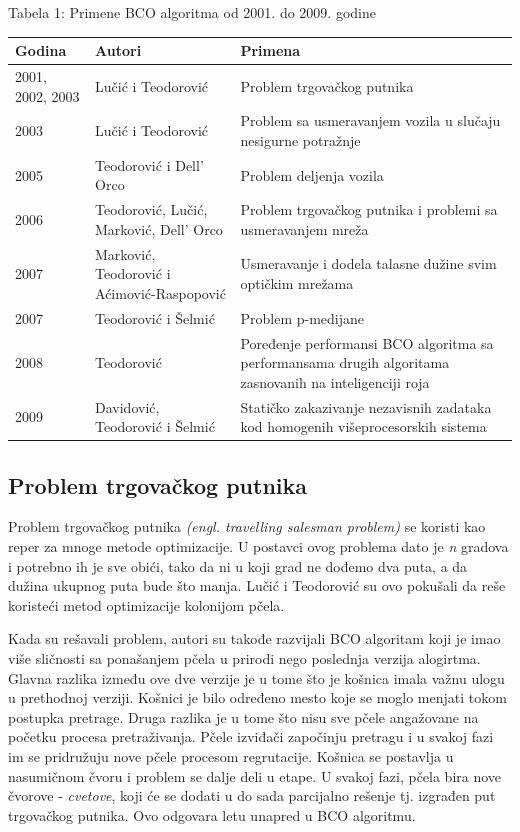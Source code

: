 \documentclass[a4paper]{article}
\begin{document}
{\begin{center}
Tabela 1: Primene BCO algoritma od 2001. do 2009. godine
\begin{tabular}{|p{1cm}|p{3cm}|p{5cm}|}
 \hline
Godina & Autori & Primena \\ \hline
2001, 2002, 2003&Lučić i Teodorović&Problem trgovačkog putnika\\ \hline
2003&Lučić i Teodorović&Problem sa usmeravanjem vozila u slučaju nesigurne potražnje\\ \hline
2005&Teodorović i Dell’ Orco&Problem deljenja vozila\\ \hline
2006&Teodorović, Lučić, Marković, Dell’ Orco & Problem trgovačkog putnika i problemi sa usmeravanjem mreža\\ \hline
2007&Marković, Teodorović i Aćimović-Raspopović & Usmeravanje i dodela talasne dužine svim optičkim mrežama\\ \hline
2007& Teodorović i Šelmić & Problem p-medijane\\ \hline
2008& Teodorović & Poređenje performansi BCO algoritma sa performansama drugih algoritama zasnovanih na inteligenciji roja\\ \hline
2009& Davidović, Teodorović i Šelmić & Statičko zakazivanje nezavisnih zadataka kod homogenih višeprocesorskih sistema\\ \hline
\end{tabular}\par
\bigskip
\end{center}

\subsection{Problem trgovačkog putnika}
\label{subsec:prvaprimena}
Problem trgovačkog putnika {\em (engl. travelling salesman problem)} se koristi kao reper za mnoge metode optimizacije. U postavci ovog problema dato je {\em n} gradova i potrebno ih je sve obići, tako da ni u koji grad ne dođemo dva puta, a da dužina ukupnog puta bude što manja. Lučić i Teodorović su ovo pokušali da reše koristeći metod optimizacije kolonijom pčela.

Kada su rešavali problem, autori su takođe razvijali BCO algoritam koji je imao više sličnosti sa ponašanjem pčela u prirodi nego poslednja verzija alogirtma. Glavna razlika između ove dve verzije je u tome što je košnica imala važnu ulogu u prethodnoj verziji. Košnici je bilo određeno mesto koje se moglo menjati tokom postupka pretrage. Druga razlika je u tome što nisu sve pčele angažovane na početku procesa pretraživanja. Pčele izviđači započinju pretragu i u svakoj fazi im se pridružuju nove pčele procesom regrutacije. Košnica se postavlja u nasumičnom čvoru i problem se dalje deli u etape. U svakoj fazi, pčela bira nove čvorove - {\em{cvetove}}, koji će se dodati u do sada parcijalno rešenje tj. izgrađen put trgovačkog putnika. Ovo odgovara letu unapred u BCO algoritmu. 

}
\end{document}
